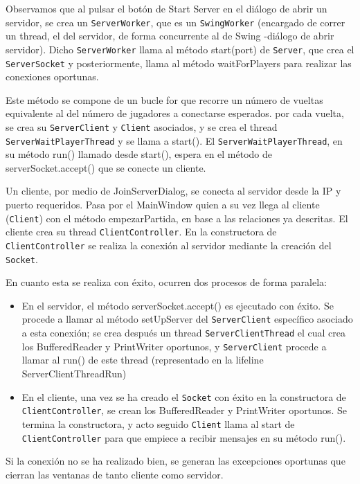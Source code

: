 \documentclass[12pt,a4paper,openright]{book}
\theoremstyle{break}
\begin{document}
Observamos que al pulsar el botón de Start Server en el diálogo de abrir un servidor, se crea un \texttt{ServerWorker}, que es un \texttt{SwingWorker} (encargado de correr un thread, el del servidor, de forma concurrente al de Swing -diálogo de abrir servidor). Dicho \texttt{ServerWorker} llama al método start(port) de \texttt{Server}, que crea el \texttt{ServerSocket} y  posteriormente, llama al método waitForPlayers para realizar las conexiones oportunas.

Este método se compone de un bucle for que recorre un número de vueltas equivalente al del número de jugadores a conectarse esperados. por cada vuelta, se crea su \texttt{ServerClient} y \texttt{Client} asociados, y se crea el thread \texttt{ServerWaitPlayerThread} y se llama a start(). El \texttt{ServerWaitPlayerThread}, en su método run() llamado desde start(), espera en el método de serverSocket.accept() que se conecte un cliente.

Un cliente, por medio de JoinServerDialog, se conecta al servidor desde la IP y puerto requeridos. Pasa por el MainWindow quien a su vez llega al cliente (\texttt{Client}) con el método empezarPartida, en base a las relaciones ya descritas. El cliente crea su thread \texttt{ClientController}. En la constructora de \texttt{ClientController} se realiza la conexión al servidor mediante la creación del \texttt{Socket}.

En cuanto esta se realiza con éxito, ocurren dos procesos de forma paralela:

\begin{itemize}
\item En el servidor, el método serverSocket.accept() es ejecutado con éxito. Se procede a llamar al método setUpServer del \texttt{ServerClient} específico asociado a esta conexión; se crea después un thread \texttt{ServerClientThread} el cual crea los BufferedReader y PrintWriter oportunos, y \texttt{ServerClient} procede a llamar al run() de este thread (representado en la lifeline ServerClientThreadRun)

\item En el cliente, una vez se ha creado el \texttt{Socket} con éxito en la constructora de \texttt{ClientController}, se crean los BufferedReader y PrintWriter oportunos. Se termina la constructora, y acto seguido \texttt{Client} llama al start de \texttt{ClientController} para que empiece a recibir mensajes en su método run().
\end{itemize}

Si la conexión no se ha realizado bien, se generan las excepciones oportunas que cierran las ventanas de tanto cliente como servidor.
\end{document}
